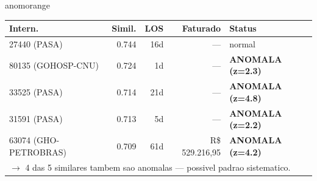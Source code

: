 \documentclass[a4paper,10pt]{article}
\begin{document}
\begin{anomalycard}[Internacao 673 | GHO-COPEL | ALTO (z=4.29)]{anomorange}
\begin{tabular}{l r r r l}\toprule\textbf{Intern.} & \textbf{Simil.} & \textbf{LOS} & \textbf{Faturado} & \textbf{Status} \\\midrule
27440 (PASA) & 0.744 & 16d & --- & \textcolor{jcubeblue}{normal} \\
80135 (GOHOSP-CNU) & 0.724 & 1d & --- & \textcolor{anomred}{\textbf{ANOMALA (z=2.3)}} \\
33525 (PASA) & 0.714 & 21d & --- & \textcolor{anomred}{\textbf{ANOMALA (z=4.8)}} \\
31591 (PASA) & 0.713 & 5d & --- & \textcolor{anomred}{\textbf{ANOMALA (z=2.2)}} \\
63074 (GHO-PETROBRAS) & 0.709 & 61d & R\$ 529.216,95 & \textcolor{anomred}{\textbf{ANOMALA (z=4.2)}} \\
\multicolumn{5}{l}{\textcolor{anomred}{\small $\rightarrow$ 4 das 5 similares tambem sao anomalas --- possivel padrao sistematico.}} \\
\bottomrule\end{tabular}


\end{anomalycard}

\newpage
\end{document}
